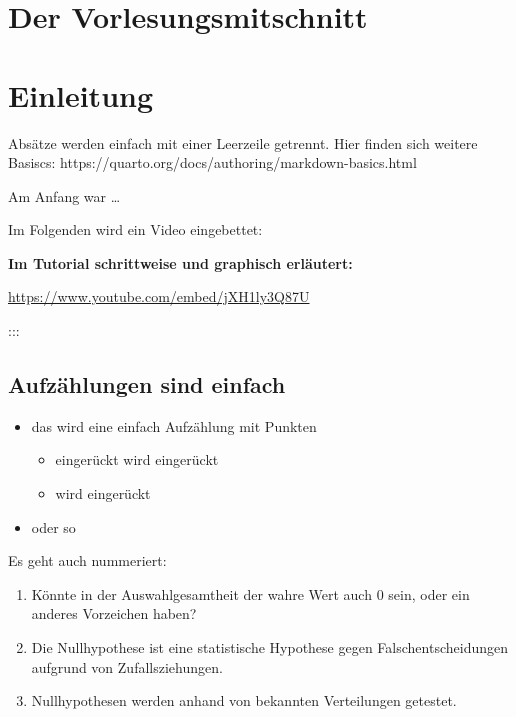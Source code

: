 \documentclass[
  10pt,
  letterpaper,
  a4paper, twoside]{scrreprt}
\providecommand{\tightlist}{%
  \setlength{\itemsep}{0pt}\setlength{\parskip}{0pt}}\usepackage{longtable,booktabs,array}
\begin{document}
\section*{Der Vorlesungsmitschnitt}\label{der-vorlesungsmitschnitt}


\section{Einleitung}\label{einleitung}

Absätze werden einfach mit einer Leerzeile getrennt. Hier finden sich
weitere Basiscs: https://quarto.org/docs/authoring/markdown-basics.html

Am Anfang war \ldots{}

Im Folgenden wird ein Video eingebettet:

\textbf{Im Tutorial schrittweise und graphisch erläutert:}

\url{https://www.youtube.com/embed/jXH1ly3Q87U}

:::

\subsection{Aufzählungen sind
einfach}\label{aufzuxe4hlungen-sind-einfach}

\begin{itemize}
\tightlist
\item
  das wird eine einfach Aufzählung mit Punkten

  \begin{itemize}
  \tightlist
  \item
    eingerückt wird eingerückt
  \item
    wird eingerückt
  \end{itemize}
\item
  oder so
\end{itemize}

Es geht auch nummeriert:

\begin{enumerate}
\def\labelenumi{\arabic{enumi}.}
\tightlist
\item
  Könnte in der Auswahlgesamtheit der wahre Wert auch 0 sein, oder ein
  anderes Vorzeichen haben?
\item
  Die Nullhypothese ist eine statistische Hypothese gegen
  Falschentscheidungen aufgrund von Zufallsziehungen.
\item
  Nullhypothesen werden anhand von bekannten Verteilungen getestet.
\end{enumerate}
\end{document}
